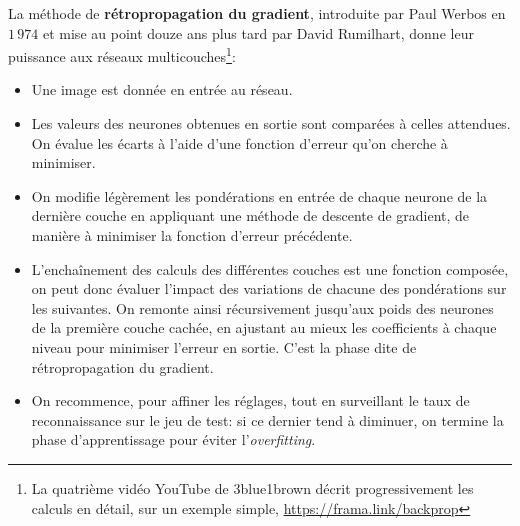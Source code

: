 \documentclass[a4paper,11pt]{article} %
\begin{document}
La méthode de \textbf{rétropropagation du gradient}, introduite par Paul Werbos en $1\,974$ et mise au point douze ans plus tard par David Rumilhart, donne leur puissance aux réseaux multicouches\footnote{La quatrième vidéo YouTube de 3blue1brown décrit progressivement les calculs en détail, sur un exemple simple, \url{https://frama.link/backprop}}:
\begin{itemize}
    \item
    Une image est donnée en entrée au réseau.
    \item
    Les valeurs des neurones obtenues en sortie sont comparées à celles attendues. On évalue les écarts à l'aide d'une fonction d'erreur qu'on cherche à minimiser.
    \item
    On modifie légèrement les pondérations en entrée de chaque neurone de la dernière couche en appliquant une méthode de descente de gradient, de manière à minimiser la fonction d'erreur précédente.
    \item
    L'enchaînement des calculs des différentes couches est une fonction composée, on peut donc évaluer l'impact des variations de chacune des pondérations sur les suivantes.
    On remonte ainsi récursivement jusqu'aux poids des neurones de la première couche cachée, en ajustant au mieux les coefficients à chaque niveau pour minimiser l'erreur en sortie. C'est la phase dite de rétropropagation du gradient.
    \item
    On recommence, pour affiner les réglages, tout en surveillant le taux de reconnaissance sur le jeu de test: si ce dernier tend à diminuer, on termine la phase d'apprentissage pour éviter l'\emph{overfitting}.
\end{itemize}
\end{document}
